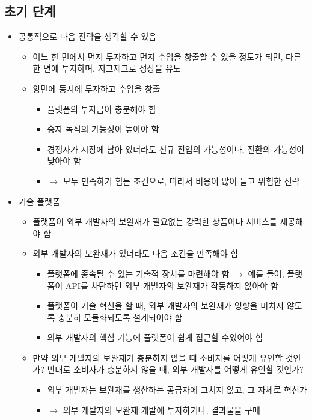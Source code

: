 \subsection{초기 단계}
\begin{itemize}
\item 공통적으로 다음 전략을 생각할 수 있음
	\begin{itemize}
	\item 어느 한 면에서 먼저 투자하고 먼저 수입을 창출할 수 있을 정도가 되면, 다른 한 면에 투자하며, 지그재그로 성장을 유도
	\item 양면에 동시에 투자하고 수입을 창출 
		\begin{itemize}
		\item 플랫폼의 투자금이 충분해야 함 
		\item 승자 독식의 가능성이 높아야 함
		\item 경쟁자가 시장에 남아 있더라도 신규 진입의 가능성이나, 전환의 가능성이 낮아야 함
		\item $\rightarrow$ 모두 만족하기 힘든 조건으로, 따라서 비용이 많이 들고 위험한 전략
		\end{itemize}
	\end{itemize}
\item 기술 플랫폼 
	\begin{itemize}
	\item 플랫폼이 외부 개발자의 보완재가 필요없는 강력한 상품이나 서비스를 제공해야 함
	\item 외부 개발자의 보완재가 있더라도 다음 조건을 만족해야 함
		\begin{itemize}
		\item 플랫폼에 종속될 수 있는 기술적 장치를 마련해야 함 $\rightarrow$ 예를 들어, 플랫폼이 API를 차단하면 외부 개발자의 보완재가 작동하지 않아야 함
		\item 플랫폼이 기술 혁신을 할 때, 외부 개발자의 보완재가 영향을 미치지 않도록 충분히 모듈화되도록 설계되어야 함
		\item 외부 개발자의 핵심 기능에 플랫폼이 쉽게 접근할 수있어야 함
		\end{itemize}
	\item 만약 외부 개발자의 보완재가 충분하지 않을 때 소비자를 어떻게 유인할 것인가? 반대로 소비자가 충분하지 않을 때, 외부 개발자를 어떻게 유인할 것인가?
		\begin{itemize}
		\item 외부 개발자는 보완재를 생산하는 공급자에 그치지 않고, 그 자체로 혁신가 
		\item $\rightarrow$ 외부 개발자의 보완재 개발에 투자하거나, 결과물을 구매

\end{itemize}
\end{itemize}
\end{itemize}
